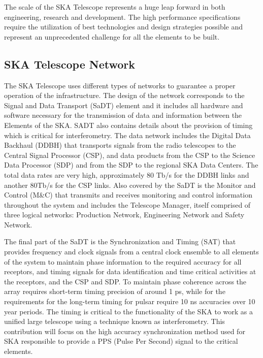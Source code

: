 


The scale of the SKA Telescope represents a huge leap forward in both 
engineering, research and development. The high performance specifications 
require the utilization of best technologies and design strategies possible and 
represent an unprecedented challenge for all the elements to be built. 

\subsection{SKA Telescope Network}

The SKA Telescope uses different types of networks to guarantee a proper operation of the infrastructure. The design of the network corresponds to the Signal and Data Transport (SaDT) element \cite{ska:sadt_website} and it includes all hardware and software necessary for the transmission of data and information between the Elements of the SKA. SADT also contains details about the provision of timing which is critical for interferometry.
The data network includes the Digital Data Backhaul (DDBH) that transports signals from the radio telescopes to the Central Signal Processor (CSP), and data products from the CSP to the Science Data Processor (SDP) and from the SDP to the regional SKA Data Centers. The total data rates are very high, approximately 80 Tb/s for the DDBH links and another 80Tb/s for the CSP links. 
Also covered by the SaDT is the Monitor and Control (M\&C) that transmits and receives monitoring and control information throughout the system and includes the Telescope Manager, itself comprised of three logical networks: Production Network, Engineering Network and Safety Network.

The final part of the SaDT is the Synchronization and Timing (SAT) that provides frequency and clock signals from a central clock ensemble to all elements of the system to maintain phase information to the required accuracy for all receptors, and timing signals for data identification and time critical activities at the receptors, and the CSP and SDP. To maintain phase coherence across the array requires short-term timing precision of around 1 ps, while for the requirements for the long-term timing for pulsar require 10 ns accuracies over 10 year periods. The timing is critical to the functionality of the SKA to work as a unified large telescope using a technique known as interferometry. This contribution will focus on the high accuracy synchronization method used for SKA responsible to provide a PPS (Pulse Per Second) signal to the critical elements. 

